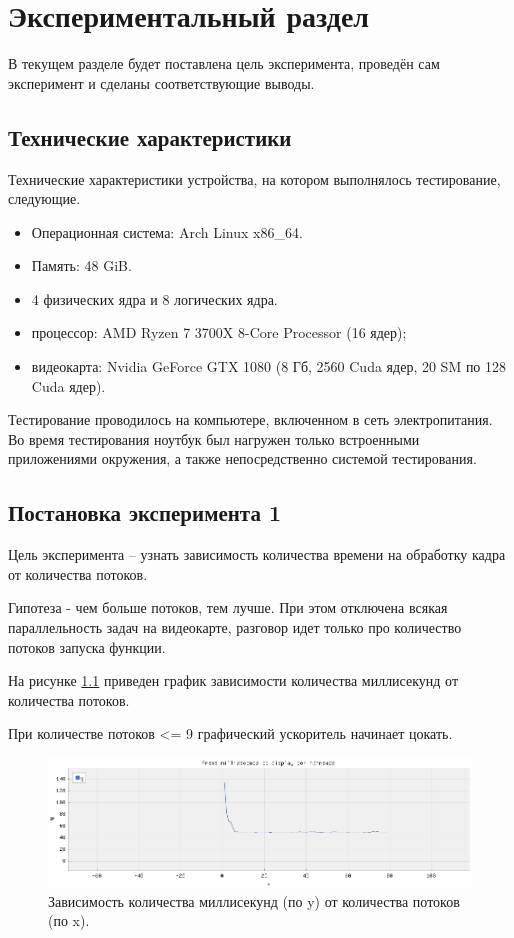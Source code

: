 \chapter{Экспериментальный раздел}
В текущем разделе будет поставлена цель эксперимента, проведён сам эксперимент и сделаны соответствующие выводы. 

\section{Технические характеристики}

Технические характеристики устройства, на котором выполнялось тестирование, следующие.

\begin{itemize}
	\item Операционная система: Arch Linux \cite{oswind} x86\_64.
	\item Память: 48 GiB.
	\item 4 физических ядра и 8 логических ядра.
	\item процессор: AMD Ryzen 7 3700X 8-Core Processor (16 ядер);
	\item видеокарта: Nvidia GeForce GTX 1080 (8 Гб, 2560 Cuda ядер, 20 SM по 128 Cuda ядер).
\end{itemize}

Тестирование проводилось на компьютере, включенном в сеть электропитания. Во время тестирования ноутбук был нагружен только встроенными приложениями окружения, а также непосредственно системой тестирования.


\section{Постановка эксперимента 1} 

Цель эксперимента -- узнать зависимость количества времени на обработку кадра от количества потоков.

Гипотеза - чем больше потоков, тем лучше. При этом отключена всякая параллельность задач на видеокарте, разговор идет только про количество потоков запуска функции.

На рисунке \ref{img:e4} приведен график зависимости количества миллисекунд от количества потоков.

При количестве потоков <= 9 графический ускоритель начинает цокать.

\begin{figure}[H]
	\begin{center}
		\includegraphics[scale=0.60]{img/avg_time_focused.png}
	\end{center}
	\captionsetup{justification=centering}
	\caption{Зависимость количества миллисекунд (по y) от количества потоков (по x). }
	\label{img:e4}
\end{figure}


